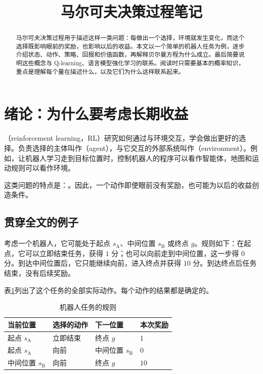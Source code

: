 \documentclass[UTF8]{ctexart}
\title{马尔可夫决策过程笔记}
\author{}
\date{}
\begin{document}
\maketitle

\begin{abstract}
马尔可夫决策过程用于描述这样一类问题：每做出一个选择，环境就发生变化，而这个选择既影响眼前的奖励，也影响以后的收益。本文以一个简单的机器人任务为例，逐步介绍状态、动作、策略、回报和价值函数，再解释贝尔曼方程为什么成立。最后简要说明这些概念与 Q-learning、语言模型强化学习的联系。阅读时只需要基本的概率知识，重点是理解每个量在描述什么，以及它们为什么这样联系起来。
\end{abstract}

\tableofcontents

\section{绪论：为什么要考虑长期收益}
\label{sec:mdp-introduction}

（reinforcement learning，RL）研究如何通过与环境交互，学会做出更好的选择。负责选择的主体叫作（agent），与它交互的外部系统叫作（environment）。例如，让机器人学习走到目标位置时，控制机器人的程序可以看作智能体，地图和运动规则可以看作环境。

这类问题的特点是：。因此，一个动作即使眼前没有奖励，也可能为以后的收益创造条件。

\subsection{贯穿全文的例子}

考虑一个机器人，它可能处于起点 $s_{\mathrm A}$、中间位置 $s_{\mathrm B}$ 或终点 $g$。规则如下：在起点，它可以立即结束任务，获得 $1$ 分；也可以向前走到中间位置，这一步得 $0$ 分。到达中间位置后，它只能继续向前，进入终点并获得 $10$ 分。到达终点后任务结束，没有后续奖励。

表\ref{tab:mdp-example}列出了这个任务的全部实际动作。每个动作的结果都是确定的。
\begin{table}
  \centering
  \caption{机器人任务的规则}
  \label{tab:mdp-example}
  \begin{tabular}{llll}
    \toprule
    当前位置 & 选择的动作 & 下一位置 & 本次奖励 \\
    \midrule
    起点 $s_{\mathrm A}$ & 立即结束 & 终点 $g$ & $1$ \\
    起点 $s_{\mathrm A}$ & 向前 & 中间位置 $s_{\mathrm B}$ & $0$ \\
    中间位置 $s_{\mathrm B}$ & 向前 & 终点 $g$ & $10$ \\
    \bottomrule
  \end{tabular}
\end{table}
\end{document}
